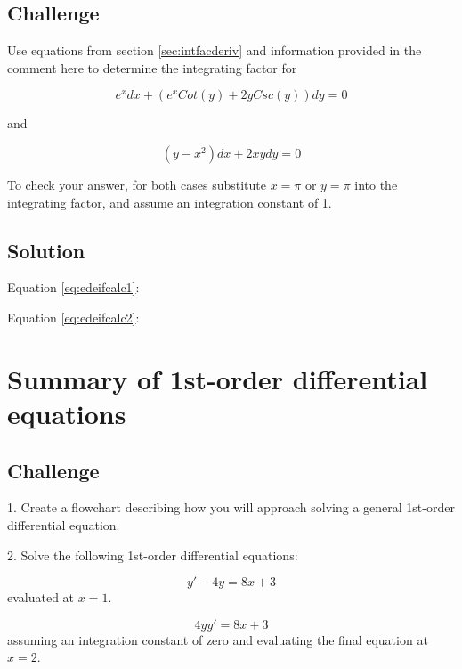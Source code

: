 \subsection*{Challenge}
Use equations from section \ref{sec:intfacderiv} and information provided in the comment here to determine the integrating factor for

\begin{equation}
    \label{eq:edeifcalc1}
    e^x dx + (e^x Cot(y) + 2y Csc(y)) dy = 0
\end{equation}

and

\begin{equation}
    \label{eq:edeifcalc2}
    (y-x^2) dx + 2xy dy = 0
\end{equation}

To check your answer, for both cases substitute $x=\pi$ or $y=\pi$ into the integrating factor, and assume an integration constant of 1.

\subsection*{Solution}


Equation \ref{eq:edeifcalc1}: 

Equation \ref{eq:edeifcalc2}: 


\timebox




\newpage
\section{Summary of 1st-order differential equations}

\subsection*{Challenge}
1. Create a flowchart describing how you will approach solving a general 1st-order differential equation.

2. Solve the following 1st-order differential equations:

\begin{equation}
    \label{eq:1odegen1}
    y' - 4y = 8x + 3
\end{equation}
evaluated at $x=1$.

\begin{equation}
    \label{eq:1odegen2}
    4yy' = 8x + 3
\end{equation}
assuming an integration constant of zero and evaluating the final equation at $x=2$.

